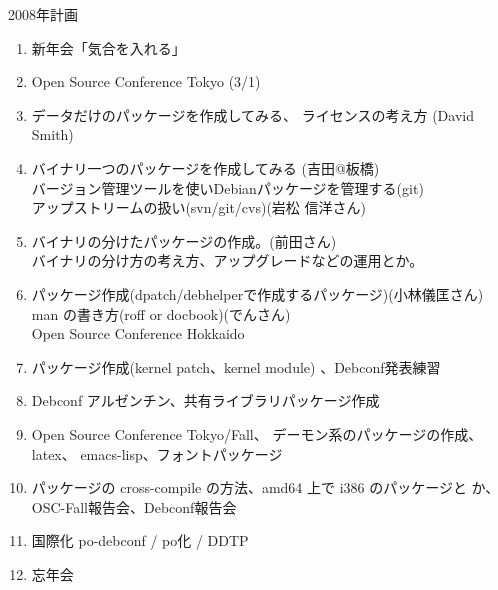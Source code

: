 \documentclass[cjk,dvipdfmx,12pt]{beamer}
\begin{document}

\begin{frame}{2008年計画}

{\scriptsize
\begin{enumerate}
 \item 新年会「気合を入れる」
 \item Open Source Conference Tokyo (3/1)
 \item データだけのパッケージを作成してみる、
       ライセンスの考え方 (David Smith)
 \item バイナリ一つのパッケージを作成してみる (吉田@板橋)\\
       バージョン管理ツールを使いDebianパッケージを管理する(git)\\
       アップストリームの扱い(svn/git/cvs)(岩松 信洋さん)
 \item バイナリの分けたパッケージの作成。(前田さん)\\
       バイナリの分け方の考え方、アップグレードなどの運用とか。
 \item パッケージ作成(dpatch/debhelperで作成するパッケージ)(小林儀匡さん)\\
       man の書き方(roff or docbook)(でんさん)\\
       Open Source Conference Hokkaido
 \item パッケージ作成(kernel patch、kernel module)
       、Debconf発表練習
 \item Debconf アルゼンチン、共有ライブラリパッケージ作成

 \item Open Source Conference Tokyo/Fall、
       デーモン系のパッケージの作成、latex、 emacs-lisp、フォントパッケージ
 \item パッケージの cross-compile の方法、amd64 上で i386 のパッケージと
       か、OSC-Fall報告会、Debconf報告会
 \item 国際化 po-debconf / po化 / DDTP
 \item 忘年会
\end{enumerate}
}
\end{frame}
\end{document}
